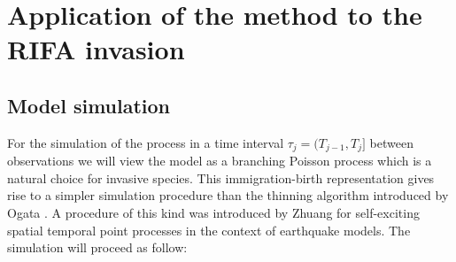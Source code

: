 \chapter[Application of the method to the RIFA invasion]{Application of the method to the RIFA invasion}
\label{ch:ModelMethod}

\section{Model simulation} \label{section:simulationModel}

For the simulation of the process in a time interval $\tau_j = (T_{j-1}, T_j]$ between observations we will view the model as a branching Poisson process \cite{Lewis} which is a natural choice for invasive species. This immigration-birth representation gives rise to a simpler simulation procedure than the thinning algorithm introduced by Ogata \cite{Ogata}. A procedure of this kind was introduced by Zhuang \cite{Zhuang} for self-exciting spatial temporal point processes in the context of earthquake models. The simulation will proceed as follow:

